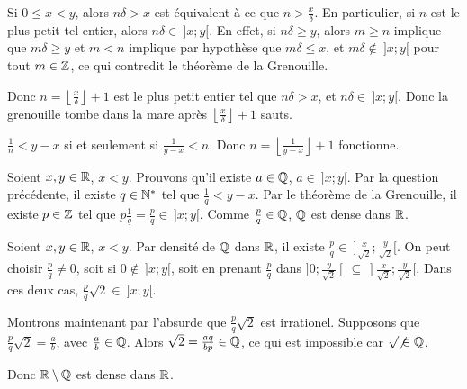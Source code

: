 \documentclass[]{../templates/homework}
\providecommand{\floor}[1]{\left \lfloor #1 \right \rfloor }
\begin{document}
\question Si $0 \leq x <y$, alors $n\delta > x$ est équivalent à ce que $n> \frac x \delta$. En particulier, si $n$ est le plus petit tel entier, alors $n\delta \in \ ]x;y[$. En effet, si $n\delta \geq y$, alors $m\geq n$ implique que $m\delta \geq y$ et $m < n$ implique par hypothèse que $m\delta \leq x$, et $m\delta \not\in\ ]x;y[$ pour tout $m\in\mathbb Z$, ce qui contredit le théorème de la Grenouille.

Donc $n = \floor {\frac x \delta} + 1$ est le plus petit entier tel que $n\delta > x$, et $n\delta \in\ ]x;y[$. Donc la grenouille tombe dans la mare après $\floor {\frac x \delta} + 1$ sauts.

\subproblem
\question $\frac 1 n < y-x$ si et seulement si $\frac 1 {y-x} < n$. Donc $n=\floor {\frac 1 {y-x}} + 1$ fonctionne.

\question Soient $x,y \in \mathbb R$, $x<y$. Prouvons qu'il existe $a\in\mathbb Q$, $a\in\ ]x;y[$.
Par la question précédente, il existe $q\in \mathbb N^*$ tel que $\frac 1 q < y-x$. Par le théorème de la Grenouille, il existe $p \in \mathbb Z$ tel que $p \frac 1 q = \frac p q \in \ ]x;y[$. Comme $\frac p q \in \mathbb Q$, $\mathbb Q$ est dense dans $\mathbb R$.

\question Soient $x,y \in \mathbb R$, $x<y$. Par densité de $\mathbb Q$ dans $\mathbb R$, il existe $\frac p q \in\ ]\frac x {\sqrt 2}; \frac y {\sqrt 2}[$. On peut choisir $\frac p q \neq 0$, soit si $0\not \in\ ]x;y[$, soit en prenant $\frac p q$ dans $]0;\frac y {\sqrt 2}[\ \subseteq\ ]\frac x {\sqrt 2}; \frac y {\sqrt 2}[$. Dans ces deux cas, $\frac p q \sqrt 2 \in\ ]x;y[$.

Montrons maintenant par l'absurde que $\frac p q \sqrt 2$ est irrationel. Supposons que $\frac p q \sqrt 2 = \frac a b$, avec $\frac a b \in \mathbb Q$. Alors $\sqrt 2 = \frac {aq} {bp} \in \mathbb Q$, ce qui est impossible car $\sqrt \not \in \mathbb Q$.

Donc $\mathbb R \setminus \mathbb Q$ est dense dans $\mathbb R$.
\end{document}
